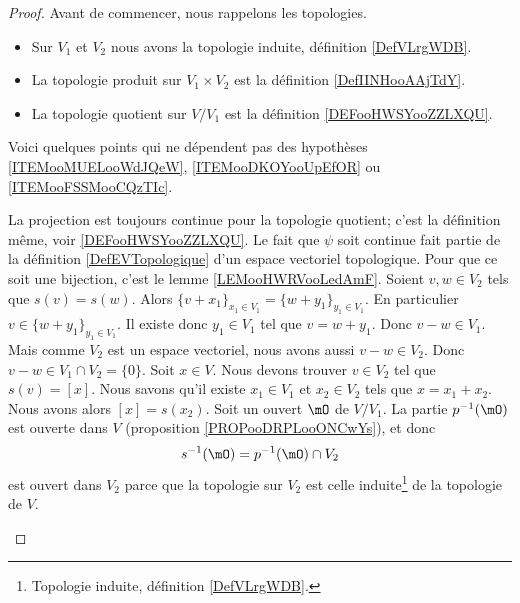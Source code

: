 \begin{proof}
	Avant de commencer, nous rappelons les topologies.
	\begin{itemize}
		\item Sur \( V_1\) et \( V_2\) nous avons la topologie induite, définition \ref{DefVLrgWDB}.
		\item La topologie produit sur \( V_1\times V_2\) est la définition \ref{DefIINHooAAjTdY}.
		\item La topologie quotient sur \( V/V_1\) est la définition \ref{DEFooHWSYooZZLXQU}.
	\end{itemize}

	Voici quelques points qui ne dépendent pas des hypothèses \ref{ITEMooMUELooWdJQeW}, \ref{ITEMooDKOYooUpEfOR} ou \ref{ITEMooFSSMooCQzTIc}.
	\begin{subproof}
		La projection est toujours continue pour la topologie quotient; c'est la définition même, voir \ref{DEFooHWSYooZZLXQU}.
		Le fait que \( \psi\) soit continue fait partie de la définition \ref{DefEVTopologique} d'un espace vectoriel topologique. Pour que ce soit une bijection, c'est le lemme \ref{LEMooHWRVooLedAmF}.
		Soient \( v,w\in V_2\) tels que \( s(v)=s(w)\). Alors \( \{ v+x_1 \}_{x_1\in V_1}=\{ w+y_1 \}_{y_1\in V_1}\). En particulier \( v\in \{ w+y_1 \}_{y_1\in V_1}\). Il existe donc \( y_1\in V_1\) tel que \( v=w+y_1\). Donc \( v-w\in V_1\). Mais comme \( V_2\) est un espace vectoriel, nous avons aussi \( v-w\in V_2\). Donc \( v-w\in V_1\cap V_2=\{ 0 \}\).
		Soit \( x\in V\). Nous devons trouver \( v\in V_2\) tel que \( s(v)=[x]\). Nous savons qu'il existe \( x_1\in V_1\) et \( x_2\in V_2\) tels que \( x=x_1+x_2\). Nous avons alors \( [x]=s(x_2)\).
		Soit un ouvert \( \mO\) de \( V/V_1\). La partie \( p^{-1}(\mO)\) est ouverte dans \( V\) (proposition \ref{PROPooDRPLooONCwYs}), et donc
		\begin{equation}
			s^{-1}(\mO)=p^{-1}(\mO)\cap V_2
		\end{equation}
		est ouvert dans \( V_2\) parce que la topologie sur \( V_2\) est celle induite\footnote{Topologie induite, définition \ref{DefVLrgWDB}.} de la topologie de \( V\).
	\end{subproof}


\end{proof}
